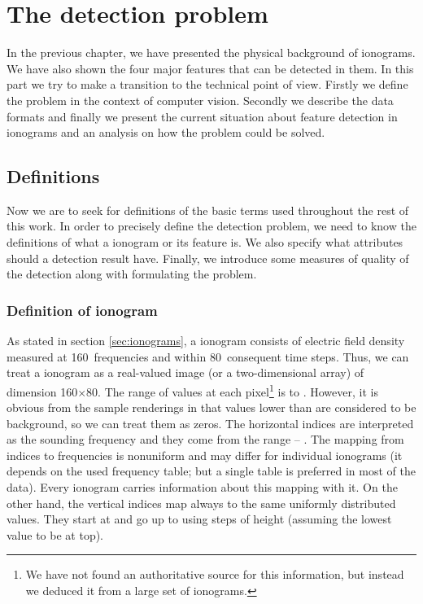 \chapter{The detection problem}
In the previous chapter, we have presented the physical background of ionograms. We have also shown the four major features that can be detected in them. In this part we try to make a transition to the technical point of view. Firstly we define the problem in the context of computer vision. Secondly we describe the data formats and finally we present the current situation about feature detection in ionograms and an analysis on how the problem could be solved.

\section{Definitions}
Now we are to seek for definitions of the basic terms used throughout the rest of this work. In order to precisely define the detection problem, we need to know the definitions of what a ionogram or its feature is. We also specify what attributes should a detection result have. Finally, we introduce some measures of quality of the detection along with formulating the problem.

\subsection{Definition of ionogram}
As stated in section \ref{sec:ionograms}, a ionogram consists of electric field density measured at 160~frequencies and within 80~consequent time steps. Thus, we can treat a ionogram as a real-valued image (or a two-dimensional array) of dimension 160$\times$80. The range of values at each pixel\footnote{We have not found an authoritative source for this information, but instead we deduced it from a large set of ionograms.} is  to . However, it is obvious from the sample renderings in \citep{FTP} that values lower than  are considered to be background, so we can treat them as zeros. The horizontal indices are interpreted as the sounding frequency and they come from the range  -- . The mapping from indices to frequencies is nonuniform and may differ for individual ionograms (it depends on the used frequency table; but a single table is preferred in most of the data). Every ionogram carries information about this mapping with it. On the other hand, the vertical indices map always to the same uniformly distributed values. They start at  and go up to  using steps of height  (assuming the lowest value to be at top).

